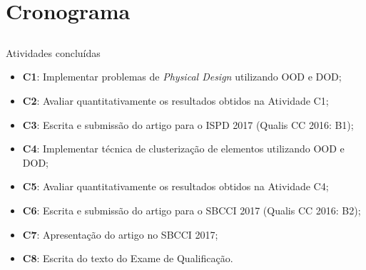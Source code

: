 \section{Cronograma}
\subsection*{}


\begin{frame}{Atividades concluídas}
    \begin{itemize}
        \item \textbf{C1}: Implementar problemas de \textit{Physical Design} utilizando OOD e DOD;
        \item \textbf{C2}: Avaliar quantitativamente os resultados obtidos na Atividade C1;
        \item \textbf{C3}: Escrita e submissão do artigo para o ISPD 2017 (Qualis  CC 2016: B1);
        \item \textbf{C4}: Implementar técnica de clusterização de elementos utilizando OOD e DOD;
        \item \textbf{C5}: Avaliar quantitativamente os resultados obtidos na Atividade C4;
        \item \textbf{C6}: Escrita e submissão do artigo para o SBCCI 2017 (Qualis  CC 2016: B2);
        \item \textbf{C7}: Apresentação do artigo no SBCCI 2017;
        \item \textbf{C8}: Escrita do texto do Exame de Qualificação.
    \end{itemize}
\end{frame}

